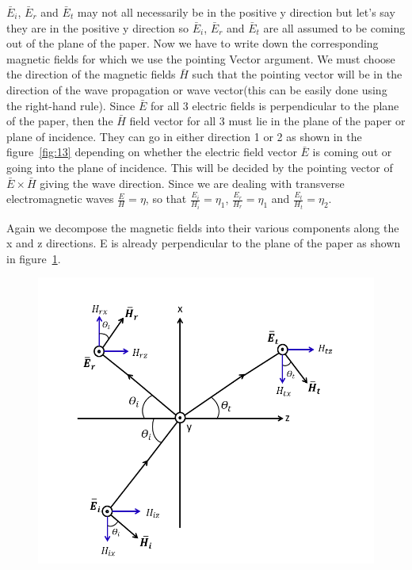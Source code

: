 $\bar{E}_{i}$, $\bar{E}_{r}$ and  $\bar{E}_{t}$ may not all necessarily be in the positive y direction but let's say they are in the positive y direction so  $\bar{E}_{i}$,  $\bar{E}_{r}$ and  $\bar{E}_{t}$ are all assumed to be coming out of the plane of the paper. Now we have to write down the corresponding magnetic fields for which we use the pointing Vector argument. We must choose the direction of the magnetic fields $\bar{H}$ such that the pointing vector will be in the direction of the wave propagation or wave vector(this can be easily done using the right-hand rule). Since $\bar{E}$ for all 3 electric fields is perpendicular to the plane of the paper, then the $\bar{H}$ field vector for all 3 must lie in the plane of the paper or plane of incidence. They can go in either direction 1 or 2 as shown in the figure~\ref{fig:13} depending on whether the electric field vector $\bar{E}$ is coming out or going into the plane of incidence. This will be decided by the pointing vector of  $\bar{E} \times \bar{H}$ giving the wave direction. Since we are dealing with transverse electromagnetic waves $\frac{E}{H} = \eta$, so that $\frac{E_{i}}{H_{i}} = \eta_{1}$, $\frac{E_{r}}{H_{r}} = \eta_{1}$ and  $\frac{E_{t}}{H_{t}} = \eta_{2}$.

Again we decompose the magnetic fields into their various components along the x and z directions. E is already perpendicular to the plane of the paper as shown in figure~\ref{fig:14}.
\begin{figure}[h]
\centering
\includegraphics[width=1.2\linewidth]{./graphics/perpendicular_polarization3}
\caption{}
\label{fig:14}
\end{figure}

